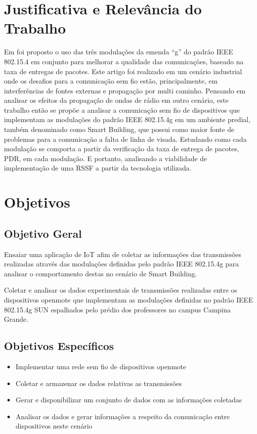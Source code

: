 \section{Justificativa e Relevância do Trabalho}
\label{sec:justificativa}
Em \cite{tuset2020dataset} foi proposto o uso das três modulações da emenda ``g'' do padrão IEEE 802.15.4 em conjunto para melhorar a qualidade das comunicações, baseado na taxa de entregas de pacotes. Este artigo foi realizado em um cenário industrial onde os desafios para a comunicação sem fio estão, principalmente, em interferências de fontes externas e propagação por multi caminho. Pensando em analisar os efeitos da propagação de ondas de rádio em outro cenário, este trabalho então se propõe a analisar a comunicação sem fio de dispositivos que implementam as modulações do padrão IEEE 802.15.4g em um ambiente predial, também denominado como Smart Building, que possui como maior fonte de problemas para a comunicação a falta de linha de visada. Estudando como cada modulação se comporta a partir da verificação da taxa de entrega de pacotes, PDR, em cada modulação. E portanto, analisando a viabilidade de implementação de uma RSSF a partir da tecnologia utilizada.

\section{Objetivos}
\label{sec:objetivos}

\subsection{Objetivo Geral}
\label{subsec:objGeral}
Ensaiar uma aplicação de IoT afim de coletar as informações das transmissões realizadas através das modulações definidas pelo padrão IEEE 802.15.4g para analisar o comportamento destas no cenário de Smart Building.

Coletar e analisar os dados experimentais de transmissões realizadas entre os dispositivos openmote que implementam as modulações definidas no padrão IEEE 802.15.4g SUN espalhados pelo prédio dos professores no campus Campina Grande.

\subsection{Objetivos Específicos}
\label{subsec:objespecificos}
\begin{itemize}
    \item Implementar uma rede sem fio de dispositivos openmote
    \item Coletar e armazenar os dados relativas as transmissões
    \item Gerar e disponibilizar um conjunto de dados com as informações coletadas
    \item Analisar os dados e gerar informações a respeito da comunicação entre dispositivos neste cenário
\end{itemize}


